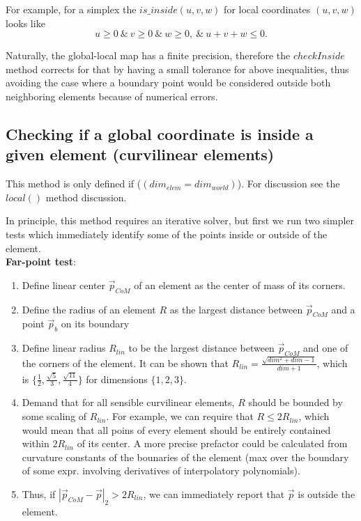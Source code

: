 \documentclass[12pt]{article}
\begin{document}
\noindent
For example, for a simplex the $is\_inside(u,v,w)$ for local coordinates $(u,v,w)$ looks like 
\[u \geq 0\ \&\ v \geq 0\ \&\ w \geq 0,\ \&\ u+v+w \leq 0. \]

\noindent
Naturally, the global-local map has a finite precision, therefore the $checkInside$ method corrects for that by having a small tolerance for above inequalities, thus avoiding the case where a boundary point would be considered outside both neighboring elements because of numerical errors.


\subsection{Checking if a global coordinate is inside a given element (curvilinear elements)}
\label{subsection-isinside-nonlinear}

\noindent
This method is only defined if ($(dim_{elem} = dim_{world})$). For discussion see the $local()$ method discussion.

\noindent
In principle, this method requires an iterative solver, but first we run two simpler tests which immediately identify some of the points inside or outside of the element. \\

\noindent
\textbf{Far-point test}:
\begin{enumerate}
	\item Define linear center $\vec{p}_{CoM}$ of an element as the center of mass of its corners.
	\item Define the radius of an element $R$ as the largest distance between $\vec{p}_{CoM}$ and a point $\vec{p}_b$ on its boundary
	\item Define linear radius $R_{lin}$ to be the largest distance between $\vec{p}_{CoM}$ and one of the corners of the element. It can be shown that $R_{lin} = \frac{\sqrt{dim^2 + dim - 1}}{dim + 1} $, which is $\{ \frac{1}{2}, \frac{\sqrt{5}}{3}, \frac{\sqrt{11}}{4} \}$ for dimensions $\{1,2,3\}$.
	\item Demand that for all sensible curvilinear elements, $R$ should be bounded by some scaling of $R_{lin}$. For example, we can require that $R \leq 2 R_{lin}$, which would mean that all poins of every element should be entirely contained within $2 R_{lin}$ of its center. A more precise prefactor could be calculated from curvature constants of the bounaries of the element (max over the boundary of some expr. involving derivatives of interpolatory polynomials).
	\item Thus, if $|\vec{p}_{CoM} - \vec{p}|_2 > 2 R_{lin}$, we can immediately report that $\vec{p}$ is outside the element.
\end{enumerate}
\end{document}
